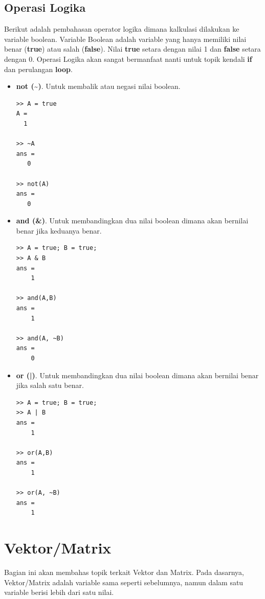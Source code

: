 \documentclass[12pt]{book}
\begin{document}
	\subsection{Operasi Logika}

	Berikut adalah pembahasan operator logika dimana kalkulasi dilakukan ke variable boolean.
	Variable Boolean adalah variable yang hanya memiliki nilai benar (\textbf{true}) atau salah (\textbf{false}).
	Nilai \textbf{true} setara dengan nilai 1 dan \textbf{false} setara dengan 0.
	Operasi Logika akan sangat bermanfaat nanti untuk topik kendali \textbf{if} dan perulangan \textbf{loop}.

	\begin{itemize}
		\item \textbf{not (\textasciitilde)}. Untuk membalik atau negasi nilai boolean.
		\begin{verbatim}
>> A = true
A =
  1

>> ~A
ans =
   0

>> not(A)
ans =
   0
		\end{verbatim}

		\newpage
		\item \textbf{and (\&)}. Untuk membandingkan dua nilai boolean dimana akan bernilai benar jika keduanya benar.
		\begin{verbatim}
>> A = true; B = true;
>> A & B
ans =
    1

>> and(A,B)
ans =
    1

>> and(A, ~B)
ans =
    0
		\end{verbatim}

		\item \textbf{or (|)}. Untuk membandingkan dua nilai boolean dimana akan bernilai benar jika salah satu benar.
		\begin{verbatim}
>> A = true; B = true;
>> A | B
ans =
    1

>> or(A,B)
ans =
    1

>> or(A, ~B)
ans =
    1
		\end{verbatim}
	\end{itemize}

	\section{Vektor/Matrix}

	Bagian ini akan membahas topik terkait Vektor dan Matrix.
	Pada dasarnya, Vektor/Matrix adalah variable sama seperti sebelumnya,
	namun dalam satu variable berisi lebih dari satu nilai.
\end{document}
